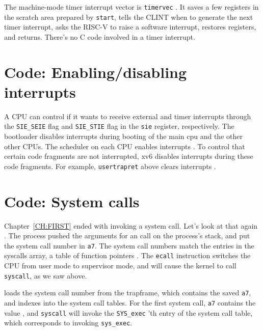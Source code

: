 The machine-mode timer interrupt vector is {\tt timervec} 
.
It saves a few registers in the scratch area prepared by {\tt start},
tells the CLINT when to generate the next timer interrupt,
asks the RISC-V to raise a software interrupt,
restores registers, and returns.
There's no C code involved in a timer interrupt.
 
\section{Code: Enabling/disabling interrupts}

A CPU can control if it wants to receive external and timer
interrupts through the \lstinline{SIE_SEIE}
 flag and \lstinline{SIE_STIE}
 flag in the \texttt{sie}
register, respectively.  The bootloader disables interrupts during
booting of the main cpu and the other other CPUs.  The scheduler on
each CPU enables interrupts .  To
control that certain code fragments are not interrupted, xv6 disables
interrupts during these code fragments.  For example,
\lstinline{usertrapret} above clears interrupts
.

\section{Code: System calls}

Chapter~\ref{CH:FIRST} ended with 
invoking a system call.
Let's look at that again
.
The process pushed the arguments
for an 
call on the process's stack, and put the
system call number in
\texttt{a7}.
The system call numbers match the entries in the syscalls array,
a table of function pointers
.
The \lstinline{ecall} instruction
switches the CPU from user mode to supervisor mode, and will
cause the kernel to call \lstinline{syscall}, as we saw above.

loads the system call number from the trapframe, which
contains the saved
\texttt{a7},
and indexes into the system call tables.
For the first system call, 
\texttt{a7}
contains the value 
,
and
\lstinline{syscall}
will invoke the 
\lstinline{SYS_exec} 'th 
entry of the system call table, which corresponds to invoking
\lstinline{sys_exec}.


